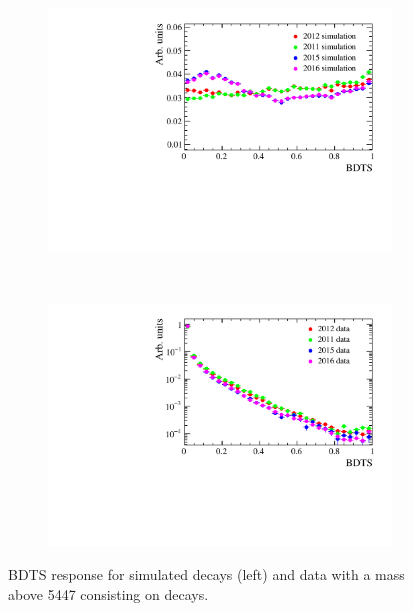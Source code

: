 \begin{figure}[htbp]
    \centering
    \begin{subfigure}[b]{0.45\textwidth}
        \includegraphics[width=\textwidth]{./Figs/Selection/BDTS_signal_Feb6.pdf}
    \end{subfigure}
    ~ %
    \begin{subfigure}[b]{0.45\textwidth}
       \includegraphics[width=\textwidth]{./Figs/Selection/BDTS_background_Feb6.pdf}
    \end{subfigure}
    \caption{BDTS response for simulated \bsmumu decays (left) and data with a mass above 5447 \mevcc consisting on \bbbarmumux decays.}
    \label{fig:FlatteningBDTS}
\end{figure}

